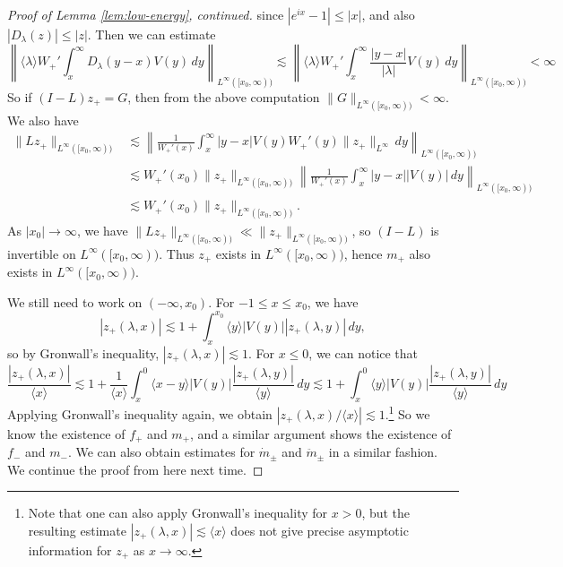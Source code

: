 \begin{proof}[Proof of Lemma \ref{lem:low-energy}, continued]
  since $|e^{ix} - 1| \le |x|$, and also
  $|D_\lambda(z)| \le |z|$. Then we can estimate
  \[
    \left\|\langle \lambda \rangle W_+' \int_x^\infty D_\lambda(y - x) V(y)\, dy \right\|_{L^\infty([x_0, \infty))}
    \lesssim
    \left\|\langle \lambda \rangle W_+' \int_x^\infty \frac{|y - x|}{|\lambda|} V(y)\, dy \right\|_{L^\infty([x_0, \infty))}
    < \infty
  \]
  So if $(I - L) z_+ = G$, then from the
  above computation $\|G\|_{L^\infty([x_0, \infty))} < \infty$.
  We also have
  \begin{align*}
    \|Lz_+\|_{L^\infty([x_0, \infty))}
    &\lesssim \left\|\frac{1}{W_+'(x)} \int_x^\infty |y - x| V(y) W_+'(y) \|z_+\|_{L^\infty}\, dy \right\|_{L^\infty([x_0, \infty))} \\
    &\lesssim W_+'(x_0) \|z_+\|_{L^\infty([x_0, \infty))}\left\|\frac{1}{W_+'(x)} \int_x^\infty |y - x| |V(y)|\, dy \right\|_{L^\infty([x_0, \infty))} \\
    &\lesssim W_+'(x_0) \|z_+\|_{L^\infty([x_0, \infty))}.
  \end{align*}
  As $|x_0| \to \infty$, we have
  $\|Lz_+\|_{L^\infty([x_0, \infty))} \ll \|z_+\|_{L^\infty([x_0, \infty))}$,
  so $(I - L)$ is invertible on
  $L^\infty([x_0, \infty))$. Thus $z_+$ exists
  in $L^\infty([x_0, \infty))$, hence
  $m_+$ also exists in $L^\infty([x_0, \infty))$.

  We still need to work on $(-\infty, x_0)$.
  For $-1 \le x \le x_0$, we have
  \[
    |z_+(\lambda, x)|
    \lesssim 1 + \int_x^{x_0} \langle y \rangle |V(y)| |z_+(\lambda, y)|\, dy,
  \]
  so by Gronwall's inequality,
  $|z_+(\lambda, x)| \lesssim 1$. For $x \le 0$,
  we can notice that
  \[
    \frac{|z_+(\lambda, x)|}{\langle x \rangle}
    \lesssim 1 + \frac{1}{\langle x \rangle} \int_x^0 \langle x - y\rangle |V(y)| \frac{|z_+(\lambda, y)|}{\langle y \rangle}\, dy
    \lesssim 1 + \int_x^0 \langle y\rangle |V(y)| \frac{|z_+(\lambda, y)|}{\langle y \rangle}\, dy
  \]
  Applying Gronwall's inequality again, we obtain
  $|z_+(\lambda, x) / \langle x \rangle| \lesssim 1$.\footnote{Note that one can also apply Gronwall's inequality for $x > 0$, but the resulting estimate $|z_+(\lambda, x)| \lesssim \langle x \rangle$ does not give precise asymptotic information for $z_+$ as $x \to \infty$.}
  So we know the existence of $f_+$ and $m_+$, and
  a similar argument shows the existence of
  $f_-$ and $m_-$. We can also obtain estimates for
  $\dot{m}_\pm$ and $\ddot{m}_\pm$ in a similar fashion.
  We continue the proof from here next time.
\end{proof}

